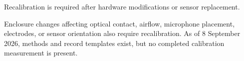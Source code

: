 \begin{requirementbox}
Recalibration is required after hardware modifications or sensor replacement.
\end{requirementbox}

Enclosure changes affecting optical contact, airflow, microphone placement, electrodes, or sensor orientation also require recalibration. As of 8 September 2026, methods and record templates exist, but no completed calibration measurement is present.
